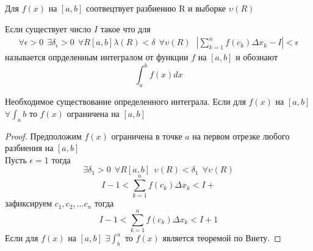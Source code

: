Для $f(x)$ на $[a,b]$ соотвецтвует разбиению R и выборке $\upsilon(R)$\\

\begin{defin}
  Если существует число $I$ такое что для
  \begin{eqnarray*}
    \forall\epsilon>0 ~~ \exists\delta_{\epsilon}>0 ~~ \forall R[a,b]
    \lambda(R)<\delta ~~ \forall\upsilon(R) ~~~
    |\sum_{k=1}^{n} f(c_k)\Delta x_k - I| < \epsilon
  \end{eqnarray*}
  называется опрделенным интегралом от функции $f$ на $[a,b]$ и обознают
  $$\int_{a}^{b} f(x)dx$$
\end{defin}

\begin{theorem}
  Необходимое существование определенного интеграла. Если для $f(x)$ на $[a,b]$
  $\forall \int_{a}{b}$ то $f(x)$ ограничена на $[a,b]$
\end{theorem}

\begin{proof}
  Предположим $f(x)$ ограничена в точке $a$ на первом отрезке любого разбиения
  на $[a,b]$\\
  Пусть $\epsilon = 1$ тогда \[\exists \delta_1 > 0 ~~ \forall R[a,b] ~~
  \upsilon(R) < \delta_1 ~~ \forall \upsilon(R)\]
  \[I-1 < \sum_{k=1}^{n} f(c_k)\Delta x_k < I+\] зафиксируем $c_1, c_2, \ldots c_n$
  тогда \[I-1 < \sum_{k=1}^{n} f(c_k)\Delta x_k < I+1\]
  Если для $f(x)$ на $[a,b]$ $\exists \int_{b}^{a}$ то $f(x)$
  является теоремой по Виету.
\end{proof}